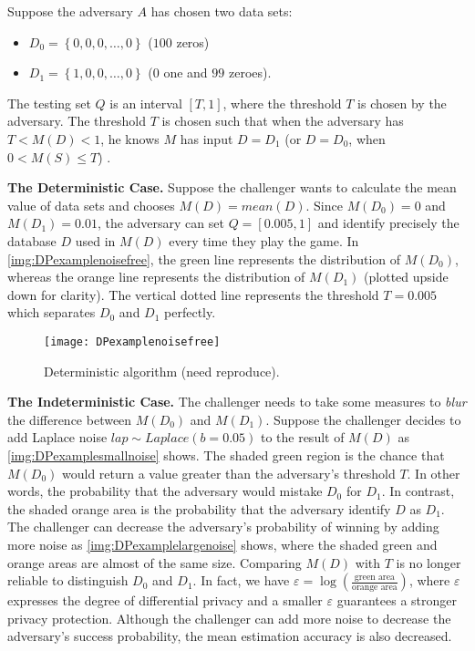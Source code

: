Suppose the adversary $A$ has chosen two data sets:
\begin{itemize}
    \item $D_{0}=\left\{ 0, 0, 0,\ldots ,0\right\} $ ($100$ zeros)
    \item $D_{1}=\left\{ 1, 0, 0,\ldots ,0\right\} $ ($0$ one and $99$ zeroes).
\end{itemize}

The testing set $Q$ is an interval $\left[ T,1\right] $, where the threshold $T$ is chosen by the adversary. The threshold $T$ is chosen such that when the adversary has $T<M\left( D\right) < 1$, he knows $M$ has input $D=D_{1}$ (or $D=D_{0}$, when $0<M\left( S\right) \leq T$) .

\textbf{The Deterministic Case.}
Suppose the challenger wants to calculate the mean value of data sets and chooses $M\left( D\right) =mean\left( D \right) $. Since $M\left( D_{0}\right) =0$ and $M\left( D_{1}\right) =0.01$, the adversary can set $Q =\left[ 0.005,1\right] $ and identify precisely the database $D$ used in $M\left( D\right) $ every time they play the game. In \autoref{img:DPexamplenoisefree}, the green line represents the distribution of $M\left( D_{0}\right)$, whereas the orange line represents the distribution of $M\left( D_{1}\right)$ (plotted upside down for clarity). The vertical dotted line represents the threshold $T=0.005$ which separates $D_{0}$ and $D_{1}$ perfectly.

\begin{figure}[htbp]
    \texttt{[image: DPexamplenoisefree]}
    \centering
    \caption{Deterministic algorithm (need reproduce).}
    \label{img:DPexamplenoisefree}
\end{figure}
\FloatBarrier

\textbf{The Indeterministic Case.}
The challenger needs to take some measures to \textit{blur} the difference between $M\left( D_{0}\right)$ and $M\left( D_{1}\right)$. Suppose the challenger decides to add Laplace noise $lap\sim Laplace\left(b=0.05\right)$ to the result of $M\left(D\right)$ as \autoref{img:DPexamplesmallnoise} shows. The shaded green region is the chance that $M\left( D_{0}\right)$ would return a value greater than the adversary's threshold $T$. In other words, the probability that the adversary would mistake $D_{0}$ for $D_{1}$. In contrast, the shaded orange area is the probability that the adversary identify $D$ as $D_{1}$. The challenger can decrease the adversary's probability of winning by adding more noise as \autoref{img:DPexamplelargenoise} shows, where the shaded green and orange areas are almost of the same size. Comparing $M\left( D\right)$ with $T$ is no longer reliable to distinguish $D_{0}$ and $D_{1}$. In fact, we have
$\varepsilon=\log \left( \frac{\text{green area}}{\text{orange area}}\right) $, where $\varepsilon$ expresses the degree of differential privacy and a smaller $\varepsilon$ guarantees a stronger privacy protection. Although the challenger can add more noise to decrease the adversary's success probability, the mean estimation accuracy is also decreased.


